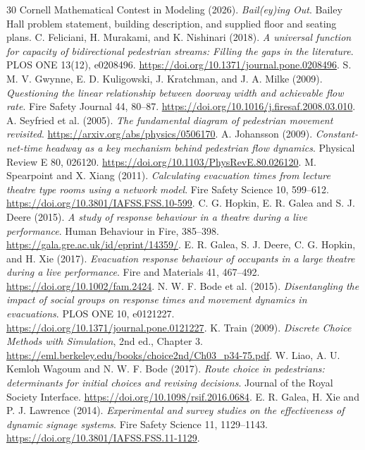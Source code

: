 \documentclass[11pt,a4paper]{article}
\begin{document}
\begin{thebibliography}{30}\small\setlength{\itemsep}{3pt}
 Cornell Mathematical Contest in Modeling (2026). \emph{Bail(ey)ing Out}. Bailey Hall problem statement, building description, and supplied floor and seating plans.
 C. Feliciani, H. Murakami, and K. Nishinari (2018). \emph{A universal function for capacity of bidirectional pedestrian streams: Filling the gaps in the literature}. PLOS ONE 13(12), e0208496. \url{https://doi.org/10.1371/journal.pone.0208496}.
 S. M. V. Gwynne, E. D. Kuligowski, J. Kratchman, and J. A. Milke (2009). \emph{Questioning the linear relationship between doorway width and achievable flow rate}. Fire Safety Journal 44, 80--87. \url{https://doi.org/10.1016/j.firesaf.2008.03.010}.
 A. Seyfried et al. (2005). \emph{The fundamental diagram of pedestrian movement revisited}. \url{https://arxiv.org/abs/physics/0506170}.
 A. Johansson (2009). \emph{Constant-net-time headway as a key mechanism behind pedestrian flow dynamics}. Physical Review E 80, 026120. \url{https://doi.org/10.1103/PhysRevE.80.026120}.
 M. Spearpoint and X. Xiang (2011). \emph{Calculating evacuation times from lecture theatre type rooms using a network model}. Fire Safety Science 10, 599--612. \url{https://doi.org/10.3801/IAFSS.FSS.10-599}.
 C. G. Hopkin, E. R. Galea and S. J. Deere (2015). \emph{A study of response behaviour in a theatre during a live performance}. Human Behaviour in Fire, 385--398. \url{https://gala.gre.ac.uk/id/eprint/14359/}.
 E. R. Galea, S. J. Deere, C. G. Hopkin, and H. Xie (2017). \emph{Evacuation response behaviour of occupants in a large theatre during a live performance}. Fire and Materials 41, 467--492. \url{https://doi.org/10.1002/fam.2424}.
 N. W. F. Bode et al. (2015). \emph{Disentangling the impact of social groups on response times and movement dynamics in evacuations}. PLOS ONE 10, e0121227. \url{https://doi.org/10.1371/journal.pone.0121227}.
 K. Train (2009). \emph{Discrete Choice Methods with Simulation}, 2nd ed., Chapter 3. \url{https://eml.berkeley.edu/books/choice2nd/Ch03_p34-75.pdf}.
 W. Liao, A. U. Kemloh Wagoum and N. W. F. Bode (2017). \emph{Route choice in pedestrians: determinants for initial choices and revising decisions}. Journal of the Royal Society Interface. \url{https://doi.org/10.1098/rsif.2016.0684}.
 E. R. Galea, H. Xie and P. J. Lawrence (2014). \emph{Experimental and survey studies on the effectiveness of dynamic signage systems}. Fire Safety Science 11, 1129--1143. \url{https://doi.org/10.3801/IAFSS.FSS.11-1129}.

\end{thebibliography}
\end{document}
